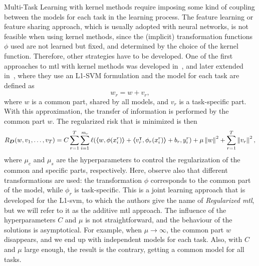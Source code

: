Multi-Task Learning with kernel methods require imposing some kind of coupling between the models for each task in the learning process. The feature learning or feature sharing approach, which is usually adopted with neural networks, is not feasible when using kernel methods, since the (implicit) transformation functions $\phi$ used are not learned but fixed, and determined by the choice of the kernel function. Therefore, other strategies have to be developed. 
One of the first approaches to \acrshort{mtl} with kernel methods was developed in~\cite{EvgeniouP04}, and later extended in~\citet{CaiC09, CaiC12}, where they use an L1-SVM formulation and the model for each task are defined as
\begin{equation}
    \nonumber
    {w}_r = {w} + {v}_r,
\end{equation} 
where $w$ is a common part, shared by all models, and $v_r$ is a task-specific part. With this approximation, the transfer of information is performed by the common part ${w}$.
The regularized risk that is minimized is then
\begin{equation}
    \nonumber
    R_{\bm{D}} ({w, v_1, \ldots, v_T}) = C \sum_{r=1}^{T} \sum_{i=1}^{m_r} \ell(
        \bm{\left\langle} w, \phi({x}_i^r) \bm{\right\rangle} + \bm{\left\langle} {v}_r^\intercal, \phi_r({x}_i^r) \bm{\right\rangle} + b_r, y_i^r) + \mu \left\lVert{w}\right\rVert^2 + \sum_{r=1}^T \left\lVert{v}_r\right\rVert^2,
\end{equation}
where $\mu_c$ and $\mu_s$ are the hyperparameters to control the regularization of the common and specific parts, respectively. 
Here, observe also that different transformations are used: the transformation $\phi$ corresponds to the common part of the model, while $\phi_r$ is task-specific.
%
This is a joint learning approach that is developed for the L1-\acrshort{svm}, to which the authors give the name of \emph{Regularized \acrshort{mtl}}, but we will refer to it as the {additive} \acrshort{mtl} approach.
The influence of the hyperparameters $C$ and $\mu$ is not straightforward, and the behaviour of the solutions is asymptotical. For example, when $\mu \to \infty$, the common part $w$ disappears, and we end up with independent models for each task. Also, with $C$ and $\mu$ large enough, the result is the contrary, getting a common model for all tasks.

